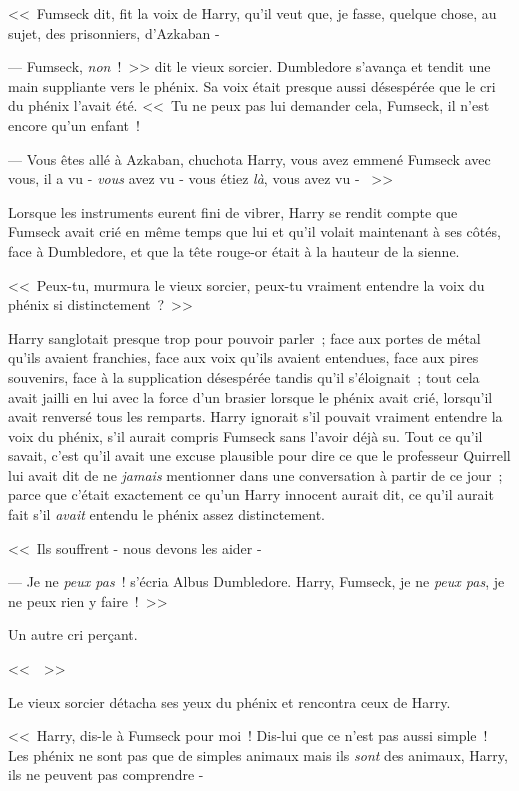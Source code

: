<<~Fumseck dit, fit la voix de Harry, qu'il veut que, je fasse, quelque chose, au sujet, des prisonniers, d'Azkaban -

--- Fumseck, \emph{non}~!~>> dit le vieux sorcier. Dumbledore s'avança et tendit une main suppliante vers le phénix. Sa voix était presque aussi désespérée que le cri du phénix l'avait été. <<~Tu ne peux pas lui demander cela, Fumseck, il n'est encore qu'un enfant~!

--- Vous êtes allé à Azkaban, chuchota Harry, vous avez emmené Fumseck avec vous, il a vu - \emph{vous} avez vu - vous étiez \emph{là}, vous avez vu - ~>>

Lorsque les instruments eurent fini de vibrer, Harry se rendit compte que Fumseck avait crié en même temps que lui et qu'il volait maintenant à ses côtés, face à Dumbledore, et que la tête rouge-or était à la hauteur de la sienne.

<<~Peux-tu, murmura le vieux sorcier, peux-tu vraiment entendre la voix du phénix si distinctement~?~>>

Harry sanglotait presque trop pour pouvoir parler~; face aux portes de métal qu'ils avaient franchies, face aux voix qu'ils avaient entendues, face aux pires souvenirs, face à la supplication désespérée tandis qu'il s'éloignait~; tout cela avait jailli en lui avec la force d'un brasier lorsque le phénix avait crié, lorsqu'il avait renversé tous les remparts. Harry ignorait s'il pouvait vraiment entendre la voix du phénix, s'il aurait compris Fumseck sans l'avoir déjà su. Tout ce qu'il savait, c'est qu'il avait une excuse plausible pour dire ce que le professeur Quirrell lui avait dit de ne \emph{jamais} mentionner dans une conversation à partir de ce jour~; parce que c'était exactement ce qu'un Harry innocent aurait dit, ce qu'il aurait fait s'il \emph{avait} entendu le phénix assez distinctement.

<<~Ils souffrent - nous devons les aider -

--- Je ne \emph{peux pas}~! s'écria Albus Dumbledore. Harry, Fumseck, je ne \emph{peux pas}, je ne peux rien y faire~!~>>

Un autre cri perçant.

<<~~>>

Le vieux sorcier détacha ses yeux du phénix et rencontra ceux de Harry.

<<~Harry, dis-le à Fumseck pour moi~! Dis-lui que ce n'est pas aussi simple~! Les phénix ne sont pas que de simples animaux mais ils \emph{sont} des animaux, Harry, ils ne peuvent pas comprendre -

